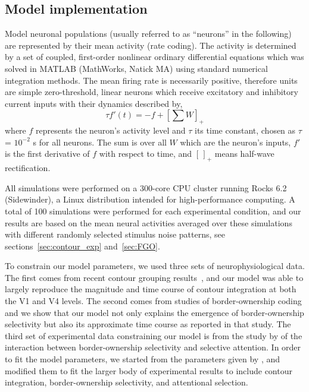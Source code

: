 \subsection{Model implementation}
\label{sec:implementation}

Model neuronal populations (usually referred to as ``neurons'' in the
following) are represented by their mean activity (rate coding).  The
activity is determined by a set of coupled, first-order nonlinear
ordinary differential equations which was solved in MATLAB (MathWorks,
Natick MA) using standard numerical integration methods.  The mean
firing rate is necessarily positive, therefore units are simple
zero-threshold, linear neurons which receive excitatory and inhibitory
current inputs with their dynamics described by,
\begin{equation}
\label{eq:1}
\tau f'(t) = -f + \left[ \sum W \right]_{+}
\end{equation}
where $f$ represents the neuron's activity level and $\tau$ its time
constant, chosen as $\tau$ = $10^{-2}$ s for all neurons. The sum is
over all $W$ which are the neuron's inputs,
$f'$ is the first derivative of $f$ with respect to
time, and $[\,]_{+}$ means half-wave rectification.

All simulations were performed on a 300-core CPU cluster running Rocks
6.2 (Sidewinder), a Linux distribution intended for high-performance
computing.  A total of 100 simulations were performed for each
experimental condition, and our results are based on the mean neural
activities averaged over these simulations with different randomly
selected stimulus noise patterns, see sections~\ref{sec:contour_exp}
and~\ref{sec:FGO}.

To constrain our model parameters, we used three sets of
neurophysiological data. The first comes from recent contour grouping
results~\citep{Chen_etal14}, and our model was able to largely
reproduce the magnitude and time course of contour integration at both
the V1 and V4 levels. The second comes from studies of border-ownership coding
\citep{Zhou_etal00} and we show that our model not only explains the
emergence of border-ownership selectivity but also its approximate
time course as reported in that study. The third set of experimental data
constraining our model is from the study by \cite{Qiu_etal07} of the
interaction between border-ownership selectivity and selective
attention. In order to fit the model
parameters, we started from the parameters given by
\cite{Mihalas_etal11b}, and modified them to fit the larger body of
experimental results to include contour integration, border-ownership
selectivity, and attentional selection.

